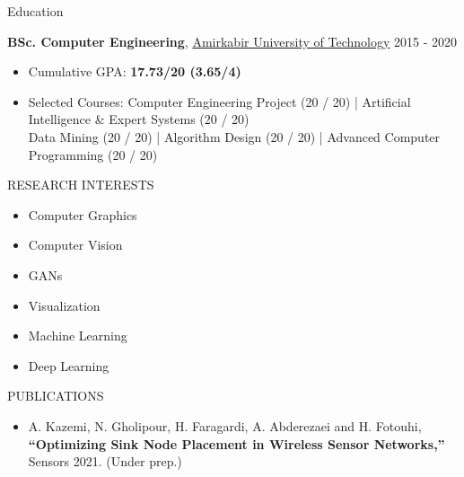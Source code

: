 \documentclass{resume} %
\begin{document}
\begin{rSection}{Education}


{\bf BSc. Computer Engineering}, \href{aut.ac.ir}{Amirkabir University of Technology} \hfill {2015 - 2020}


\begin{itemize}
    \itemsep -3pt {} 
     \item Cumulative GPA: \textbf{17.73/20  (3.65/4)} 
     \item Selected Courses:
	\small{Computer Engineering Project  (20 / 20) | Artificial Intelligence \& Expert Systems (20 / 20)  \\ Data Mining (20 / 20) | Algorithm Design (20 / 20) | Advanced Computer Programming (20 / 20)}
 \end{itemize}

\end{rSection}


\begin{rSection}{RESEARCH INTERESTS}

\begin{multicols}{3}
\begin{itemize}
    \itemsep -3pt {} 
     \item Computer Graphics
     \item Computer Vision
     \item GANs
     \item Visualization
     \item Machine Learning
     \item Deep Learning
 \end{itemize}
 \end{multicols}

\end{rSection}


\begin{rSection}{PUBLICATIONS}

\begin{itemize}
    \itemsep -3pt {}
    \item A. Kazemi, N. Gholipour, H. Faragardi, A. Abderezaei and H. Fotouhi, \textbf{“Optimizing Sink Node Placement in Wireless Sensor Networks,”} Sensors 2021. (Under prep.)
 \end{itemize}

\end{rSection}
\end{document}
